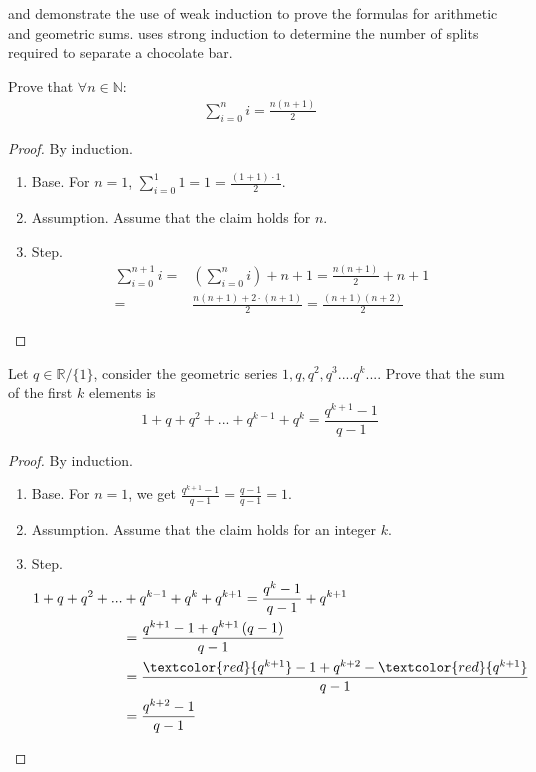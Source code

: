  and  demonstrate the use of weak induction to prove the formulas for arithmetic and geometric sums.  uses strong induction to determine the number of splits required to separate a chocolate bar.

\begin{example} 
  \label{example:sumweak}
Prove that $ \forall n \in  \mathbb{N}$: 
  \begin{equation*}
    \begin{split}
  \sum_{i=0}^{n}{i} = \frac{n(n+1)}{2}
    \end{split}
  \end{equation*}
  \begin{proof} By induction.
  \begin{enumerate}
    \item Base. For \(n = 1\), \(\sum_{i=0}^{1}{1} = 1 = \frac{(1+1)\cdot 1}{2} \). 
      \item Assumption. Assume that the claim holds for \(n\). 
      \item Step. 
\begin{equation*}
  \begin{split}
 \sum_{i=0}^{n+1}{i} = & \left( \sum_{i=0}^{n}{i} \right) + n+1 = \frac{n(n+1)}{2} + n + 1 \\
 = & \frac{n(n+1) + 2\cdot (n+1)}{2} = \frac{(n+1)(n+2)}{2} 
  \end{split}
\end{equation*}
  \end{enumerate}
\end{proof}
\end{example}
\begin{example} 
  \label{example:sumweak2}
  Let \(q\in \mathbb{R} / \{1\}\), consider the geometric series \( 1,q,q^2,q^3....q^k...\). Prove that the sum of the first \(k\) elements is \begin{equation*}
     1+q+q^2+...+q^{k-1}+q^k = \frac{q^{k+1}-1}{q-1}
\end{equation*}

\begin{proof} By induction. 
  \begin{enumerate}
    \item      Base. For \(n = 1\), we get \( \frac{q^{k+1}-1}{q-1} = \frac{q-1}{q-1} = 1\). 
    \item      Assumption. Assume that the claim holds for an integer \(k\). 
    \item      Step. 
      \begin{equation*}
	\begin{split}
	  1+q+q^2+... & + q^{k-1}+q^k + q^{k+1} =  \frac{q^{k}-1}{q-1} + q^{k+1}  \\
	  &= \frac{q^{k+1}-1 +q^{k+1}\left(q-1\right) }{q-1}  \\ &=\frac{\textcolor{red}{q^{k+1}}-1 +q^{k+2} - \textcolor{red}{q^{k+1}}  }{q-1} \\ &= \frac{q^{k+2}-1}{q-1} 
	\end{split}
      \end{equation*}
  \end{enumerate}
\end{proof}
\end{example}
